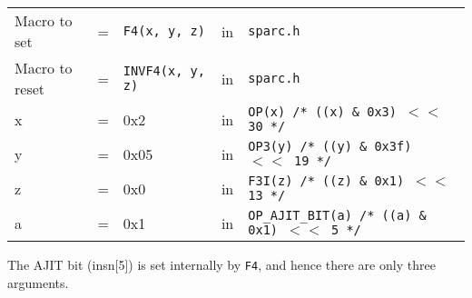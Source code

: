 \begin{enumerate}
  \begin{tabular}[h]{lclcl}
    Macro to set  &=& \texttt{F4(x, y, z)} &in& \texttt{sparc.h}     \\
    Macro to reset  &=& \texttt{INVF4(x, y, z)} &in& \texttt{sparc.h}     \\
    x &=& 0x2      &in& \texttt{OP(x)  /* ((x) \& 0x3)  $<<$ 30 */} \\
    y &=& 0x05     &in& \texttt{OP3(y) /* ((y) \& 0x3f) $<<$ 19 */} \\
    z &=& 0x0      &in& \texttt{F3I(z) /* ((z) \& 0x1)  $<<$ 13 */} \\
    a &=& 0x1      &in& \texttt{OP\_AJIT\_BIT(a) /* ((a) \& 0x1)  $<<$ 5 */}
  \end{tabular}

  The AJIT bit  (insn[5]) is set internally by  \texttt{F4}, and hence
  there are only three arguments.


\end{enumerate}
